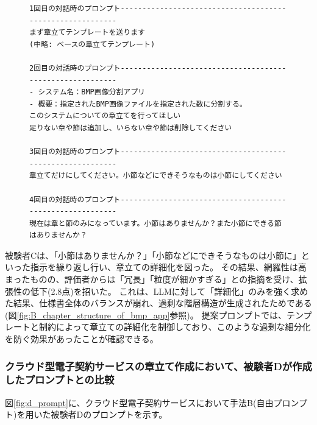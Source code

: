 \begin{figure}[tp]
\begin{tcolorbox}[
  colback=white,
  colframe=green!35!black,
  fonttitle=\bfseries,
]
\footnotesize
\ttfamily
\fontsize{7}{8}\selectfont
\begin{verbatim}
1回目の対話時のプロンプト----------------------------------------------------------
まず章立てテンプレートを送ります
(中略: ベースの章立てテンプレート)

2回目の対話時のプロンプト----------------------------------------------------------
- システム名：BMP画像分割アプリ
- 概要：指定されたBMP画像ファイルを指定された数に分割する。
このシステムについての章立てを行ってほしい
足りない章や節は追加し、いらない章や節は削除してください

3回目の対話時のプロンプト----------------------------------------------------------
章立てだけにしてください。小節などにできそうなものは小節にしてください

4回目の対話時のプロンプト----------------------------------------------------------
現在は章と節のみになっています。小節はありませんか？また小節にできる節はありませんか？
\end{verbatim}
\end{tcolorbox}
\par\vspace{-10pt}
\label{fig:c_prompt}
\end{figure}

被験者Cは、「小節はありませんか？」「小節などにできそうなものは小節に」といった指示を繰り返し行い、章立ての詳細化を図った。
その結果、網羅性は高まったものの、評価者からは「冗長」「粒度が細かすぎる」との指摘を受け、拡張性の低下(2.8点)を招いた。
これは、LLMに対して「詳細化」のみを強く求めた結果、仕様書全体のバランスが崩れ、過剰な階層構造が生成されたためである(図\ref{fig:B_chapter_structure_of_bmp_app}参照)。
提案プロンプトでは、テンプレートと制約によって章立ての詳細化を制御しており、このような過剰な細分化を防ぐ効果があったことが確認できる。

\subsubsection{クラウド型電子契約サービスの章立て作成において、被験者Dが作成したプロンプトとの比較}
図\ref{fig:d_prompt}に、クラウド型電子契約サービスにおいて手法B(自由プロンプト)を用いた被験者Dのプロンプトを示す。

